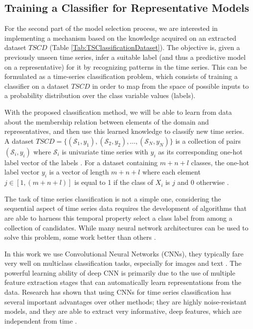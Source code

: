 \subsection{Training a Classifier for Representative Models}
\label{Sec:TrainingClassifier}

For the second part of the model selection process, we are interested in implementing a mechanism based on the knowledge acquired on an extracted dataset $TSCD$ (Table \ref{Tab:TSClassificationDataset}). The objective is, given a previously unseen time series, infer a suitable label (and thus a predictive model on a representative) for it by recognizing patterns in the time series. This can be formulated as a time-series classification problem, which consists of training a classifier on a dataset $TSCD$ in order to map from the space of possible inputs to a probability distribution over the class variable values (labels). 

With the proposed classification method, we will be able to learn from data about the membership relation between elements of the domain and representatives, and then use this learned knowledge to classify new time series. A dataset $TSCD=\{(\mathcal{S}_1,y_1),(\mathcal{S}_2,y_2), \ldots ,(\mathcal{S}_N,y_N)\}$ is a collection of pairs $(\mathcal{S}_i,y_i)$ where $\mathcal{S}_i$ is univariate time series with $y_i$ as its corresponding one-hot label vector of the labels \cite{Gulli2017}. For a dataset containing $m+n+l$ classes, the one-hot label vector $y_i$ is a vector of length $m+n+l$ where each element $j \in [1,(m+n+l)]$ is equal to 1 if the class of $X_i$ is $j$ and $0$ otherwise \cite{Mitsa2010}.

The task of time series classification is not a simple one, considering the sequential aspect of time series data requires the development of algorithms that are able to harness this temporal property select a class label from among a collection of candidates. While many neural network architectures can be used to solve this problem, some work better than others \cite{Bagnall2017a}. 

In this work we use Convolutional Neural Networks (CNNs), they typically fare very well on multiclass classification tasks, especially for images and text \cite{Goodfellow2016}. The powerful learning ability of deep CNN is primarily due to the use of multiple feature extraction stages that can automatically learn representations from the data. Research has shown that using CNNs for time series classification has several important advantages over other methods; they are highly noise-resistant models, and they are able to extract very informative, deep features, which are independent from time \cite{Wang2016, Bagnall2017a, Zhao2017}.

